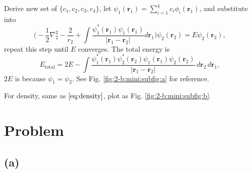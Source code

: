 \documentclass[12pt]{article}
\newcommand*{\RMN}[1]{\uppercase\expandafter{\romannumeral#1}}
\begin{document}
Derive new set of $\{ c_1, c_2, c_3, c_4\}$, let $\psi_1(\symbf{r}_1) =
    \sum_{i=1}^{4} c_i \phi_i(\symbf{r}_1)$, and substitute
into
\begin{equation}
    \Big(- \frac{1}{2}\nabla_2^2 - \frac{2}{r_2}
    + \int \frac{\psi_1^\ast(\symbf{r}_1)\psi_1(\symbf{r}_1)}{\lvert \symbf{r}_1 -
        \symbf{r}_2 \rvert} d\symbf{r}_1 \Big) \psi_2(\symbf{r}_2) = E \psi_2 (\symbf{r}_2),
\end{equation}
repeat this step until $E$ converges.
The total energy is
\begin{equation}
    E_{\text{total}} = 2E -
    \int \frac{\psi_1^\ast(\symbf{r}_1)\psi_2^\ast(\symbf{r}_2) \psi_1(\symbf{r}_1)
        \psi_2(\symbf{r}_2)}{\lvert
        \symbf{r}_1 - \symbf{r}_2 \rvert}\, d\symbf{r}_2 \, d\symbf{r}_1,
\end{equation}
$2E$ is because $\psi_1 = \psi_2$.
See Fig. \ref{fig:2-b:mini:subfig:a} for reference.


For density, same as $\eqref{eq:density}$, plot as Fig. \ref{fig:2-b:mini:subfig:b}.

\section{Problem \RMN{3}}

\subsection*{(a)}
\end{document}

